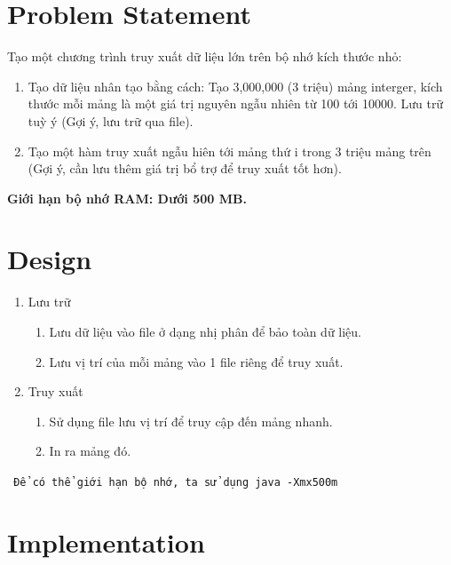 \documentclass[a4paper]{article}
\theoremstyle{definition}
\begin{document}
\tableofcontents
\newpage
{}

\section{Problem Statement}
Tạo một chương trình truy xuất dữ liệu lớn trên bộ nhớ kích thước nhỏ:
\begin{enumerate}
\item Tạo dữ liệu nhân tạo bằng cách: Tạo 3,000,000 (3 triệu) mảng interger, kích thước mỗi mảng là một giá trị nguyên ngẫu nhiên từ 100 tới 10000. Lưu trữ tuỳ ý (Gợi ý, lưu trữ qua file).
\item Tạo một hàm truy xuất ngẫu hiên tới mảng thứ i trong 3 triệu mảng trên (Gợi ý, cần lưu thêm giá trị bổ trợ để truy xuất tốt hơn).
\end{enumerate}
\textbf{Giới hạn bộ nhớ RAM: Dưới 500 MB.}

\section{Design}
\begin{enumerate}[]
  \item Lưu trữ
  \begin{enumerate}[-]
    \item Lưu dữ liệu vào file ở dạng nhị phân để bảo toàn dữ liệu.
    \item Lưu vị trí của mỗi mảng vào 1 file riêng để truy xuất.
  \end{enumerate}
  \item Truy xuất
  \begin{enumerate}[-]
    \item Sử dụng file lưu vị trí để truy cập đến mảng nhanh.
    \item In ra mảng đó.
  \end{enumerate}
\end{enumerate}
\texttt{ Để có thể giới hạn bộ nhớ, ta sử dụng java -Xmx500m}

\section{Implementation}
\end{document}
